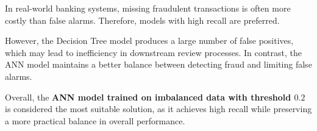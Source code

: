 In real-world banking systems, missing fraudulent transactions is often more costly than false alarms. Therefore, models with high recall are preferred.

However, the Decision Tree model produces a large number of false positives, which may lead to inefficiency in downstream review processes. In contrast, the ANN model maintains a better balance between detecting fraud and limiting false alarms.

Overall, the \textbf{ANN model trained on imbalanced data with threshold $0.2$} is considered the most suitable solution, as it achieves high recall while preserving a more practical balance in overall performance.